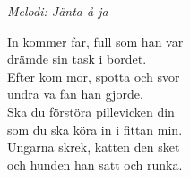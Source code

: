 {\footnotesize\textit{Melodi: Jänta å ja}}\par
\vspace{10pt}
In kommer far, full som han var\\
drämde sin task i bordet.\\
Efter kom mor, spotta och svor\\
undra va fan han gjorde.\\
Ska du förstöra pillevicken din\\
som du ska köra in i fittan min.\\
Ungarna skrek, katten den sket\\
och hunden han satt och runka.
